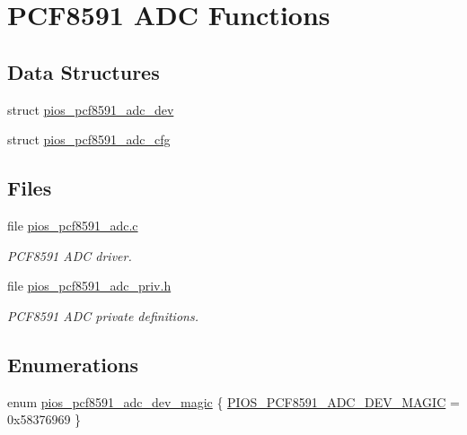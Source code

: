 \hypertarget{group___p_i_o_s___p_c_f8591___a_d_c}{\section{\-P\-C\-F8591 \-A\-D\-C \-Functions}
\label{group___p_i_o_s___p_c_f8591___a_d_c}
}
\subsection*{\-Data \-Structures}
\begin{DoxyCompactItemize}
\item 
struct \hyperlink{structpios__pcf8591__adc__dev}{pios\-\_\-pcf8591\-\_\-adc\-\_\-dev}
\item 
struct \hyperlink{structpios__pcf8591__adc__cfg}{pios\-\_\-pcf8591\-\_\-adc\-\_\-cfg}
\end{DoxyCompactItemize}
\subsection*{\-Files}
\begin{DoxyCompactItemize}
\item 
file \hyperlink{pios__pcf8591__adc_8c}{pios\-\_\-pcf8591\-\_\-adc.\-c}
\begin{DoxyCompactList}\small\item\em \-P\-C\-F8591 \-A\-D\-C driver. \end{DoxyCompactList}\item 
file \hyperlink{pios__pcf8591__adc__priv_8h}{pios\-\_\-pcf8591\-\_\-adc\-\_\-priv.\-h}
\begin{DoxyCompactList}\small\item\em \-P\-C\-F8591 \-A\-D\-C private definitions. \end{DoxyCompactList}\end{DoxyCompactItemize}
\subsection*{\-Enumerations}
\begin{DoxyCompactItemize}
\item 
enum \hyperlink{group___p_i_o_s___p_c_f8591___a_d_c_ga6540537fe983c01aed8d16cc97711b14}{pios\-\_\-pcf8591\-\_\-adc\-\_\-dev\-\_\-magic} \{ \hyperlink{group___p_i_o_s___p_c_f8591___a_d_c_gga6540537fe983c01aed8d16cc97711b14a6bc64c30b740979abf03aa7c83003904}{\-P\-I\-O\-S\-\_\-\-P\-C\-F8591\-\_\-\-A\-D\-C\-\_\-\-D\-E\-V\-\_\-\-M\-A\-G\-I\-C} =  0x58376969
 \}
\end{DoxyCompactItemize}
